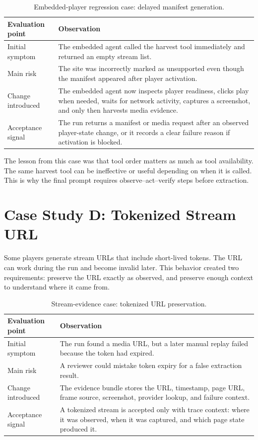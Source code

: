 \begin{table}[!htbp]
\centering
\begin{tabularx}{\textwidth}{Q{3.8cm}Y}
\toprule
{}
Evaluation point & Observation \\
\midrule
Initial symptom & The embedded agent called the harvest tool immediately and
returned an empty stream list. \\
Main risk & The site was incorrectly marked as unsupported even though the
manifest appeared after player activation. \\
Change introduced & The embedded agent now inspects player readiness, clicks
play when needed, waits for network activity, captures a screenshot, and only
then harvests media evidence. \\
Acceptance signal & The run returns a manifest or media request after an
observed player-state change, or it records a clear failure reason if activation
is blocked. \\
\bottomrule
\end{tabularx}
\caption{Embedded-player regression case: delayed manifest generation.}
\label{tab:case-embedded-delayed-manifest}
\end{table}

The lesson from this case was that tool order matters as much as tool
availability. The same harvest tool can be ineffective or useful depending on
when it is called. This is why the final prompt requires observe--act--verify
steps before extraction.

\section{Case Study D: Tokenized Stream URL}

Some players generate stream URLs that include short-lived tokens. The URL can
work during the run and become invalid later. This behavior created two
requirements: preserve the URL exactly as observed, and preserve enough context
to understand where it came from.

\begin{table}[!htbp]
\centering
\begin{tabularx}{\textwidth}{Q{3.8cm}Y}
\toprule
{}
Evaluation point & Observation \\
\midrule
Initial symptom & The run found a media URL, but a later manual replay failed
because the token had expired. \\
Main risk & A reviewer could mistake token expiry for a false extraction result. \\
Change introduced & The evidence bundle stores the URL, timestamp, page URL,
frame source, screenshot, provider lookup, and failure context. \\
Acceptance signal & A tokenized stream is accepted only with trace context:
where it was observed, when it was captured, and which page state produced it. \\
\bottomrule
\end{tabularx}
\caption{Stream-evidence case: tokenized URL preservation.}
\label{tab:case-tokenized-url}
\end{table}

